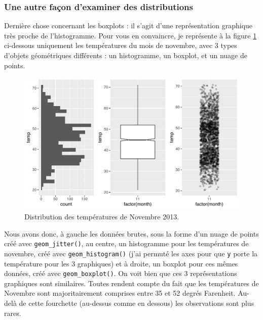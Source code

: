 \documentclass[a4paperpaper,]{article}
\begin{document}
\hypertarget{une-autre-facon-dexaminer-des-distributions}{%
\subsubsection{Une autre façon d'examiner des distributions}\label{une-autre-facon-dexaminer-des-distributions}}

Dernière chose concernant les boxplots : il s'agit d'une représentation graphique très proche de l'histogramme. Pour vous en convaincre, je représente à la figure \ref{fig:compboxplot} ci-dessous uniquement les températures du mois de novembre, avec 3 types d'objets géométriques différents : un histogramme, un boxplot, et un nuage de points.

\begin{figure}[htpb]

{\centering \includegraphics[width=0.9\linewidth]{figure/compboxplot-1} 

}

\caption{Distribution des températures de Novembre 2013.}\label{fig:compboxplot}
\end{figure}

Nous avons donc, à gauche les données brutes, sous la forme d'un nuage de points créé avec \texttt{geom\_jitter()}, au centre, un histogramme pour les températures de novembre, créé avec \texttt{geom\_histogram()} (j'ai permuté les axes pour que \texttt{y} porte la température pour les 3 graphiques) et à droite, un boxplot pour ces mêmes données, créé avec \texttt{geom\_boxplot()}. On voit bien que ces 3 représentations graphiques sont similaires. Toutes rendent compte du fait que les températures de Novembre sont majoritairement comprises entre 35 et 52 degrés Farenheit. Au-delà de cette fourchette (au-dessus comme en dessous) les observations sont plus rares.
\end{document}
